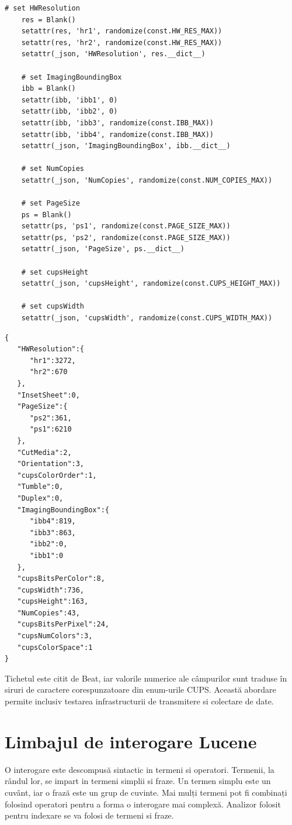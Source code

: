 \documentclass[a4paper, 12pt, twoside]{report}
\begin{document}
\begin{lstlisting}[caption={cazurile speciale, tratate individual - Python},captionpos=b]
# set HWResolution        
    res = Blank()
    setattr(res, 'hr1', randomize(const.HW_RES_MAX))
    setattr(res, 'hr2', randomize(const.HW_RES_MAX))
    setattr(_json, 'HWResolution', res.__dict__)

    # set ImagingBoundingBox
    ibb = Blank()
    setattr(ibb, 'ibb1', 0)
    setattr(ibb, 'ibb2', 0)
    setattr(ibb, 'ibb3', randomize(const.IBB_MAX))
    setattr(ibb, 'ibb4', randomize(const.IBB_MAX))
    setattr(_json, 'ImagingBoundingBox', ibb.__dict__)

    # set NumCopies
    setattr(_json, 'NumCopies', randomize(const.NUM_COPIES_MAX))

    # set PageSize
    ps = Blank()
    setattr(ps, 'ps1', randomize(const.PAGE_SIZE_MAX))
    setattr(ps, 'ps2', randomize(const.PAGE_SIZE_MAX))
    setattr(_json, 'PageSize', ps.__dict__)

    # set cupsHeight
    setattr(_json, 'cupsHeight', randomize(const.CUPS_HEIGHT_MAX))

    # set cupsWidth
    setattr(_json, 'cupsWidth', randomize(const.CUPS_WIDTH_MAX))
\end{lstlisting}
\begin{lstlisting}[caption={exemplu de output pentru programul de mai sus - JSON},captionpos=b]
{  
   "HWResolution":{  
      "hr1":3272,
      "hr2":670
   },
   "InsetSheet":0,
   "PageSize":{  
      "ps2":361,
      "ps1":6210
   },
   "CutMedia":2,
   "Orientation":3,
   "cupsColorOrder":1,
   "Tumble":0,
   "Duplex":0,
   "ImagingBoundingBox":{  
      "ibb4":819,
      "ibb3":863,
      "ibb2":0,
      "ibb1":0
   },
   "cupsBitsPerColor":8,
   "cupsWidth":736,
   "cupsHeight":163,
   "NumCopies":43,
   "cupsBitsPerPixel":24,
   "cupsNumColors":3,
   "cupsColorSpace":1
}
\end{lstlisting}
Tichetul este citit de Beat, iar valorile numerice ale câmpurilor sunt traduse în siruri de caractere corespunzatoare din enum-urile CUPS. 
Această abordare permite inclusiv testarea infrastructurii de transmitere si colectare de date.

	\section{Limbajul de interogare Lucene}
O interogare este descompusă sintactic in termeni si operatori. Termenii, la rândul lor, se impart in termeni simplii si fraze. Un termen simplu este un cuvânt, iar o frază este un grup de cuvinte. Mai mulți termeni pot fi combinați folosind operatori pentru a forma o interogare mai complexă. Analizor folosit pentru indexare se va folosi de termeni si fraze.
\end{document}
